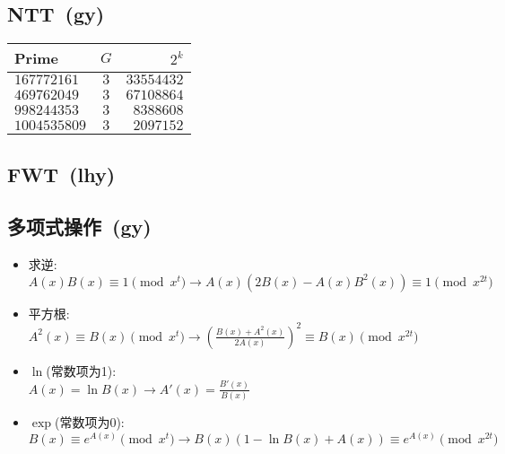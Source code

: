     \subsection*{NTT\ \small(gy)}
        \begin{tabular}{l c r}
            \hline
            Prime & $ G $ & $ 2^k $\\\hline
            $ 167772161 $ & $ 3 $ & $ 33554432 $\\\hline
            $ 469762049 $ & $ 3 $ & $ 67108864 $\\\hline
            $ 998244353 $ & $ 3 $ & $ 8388608 $\\\hline
            $ 1004535809 $ & $ 3 $ & $ 2097152 $\\\hline
        \end{tabular}
    \subsection*{FWT\ \small(lhy)}
    \subsection*{多项式操作\ \small(gy)}
        \begin{itemize}[wide=0pt]
            \item 求逆:
            \\$ A(x) B(x) \equiv 1 \pmod{x^t} \to A(x) (2B(x) - A(x) B^2(x)) \equiv 1 \pmod{x^{2t}} $
            \item 平方根:
            \\$ A^2(x) \equiv B(x) \pmod{x^t} \to (\frac{B(x) + A^2(x)}{2A(x)})^2 \equiv B(x) \pmod{x^{2t}} $
            \item $ \ln $(常数项为1):
            \\$ A(x) = \ln B(x) \to A'(x) = \frac{B'(x)}{B(x)} $
            \item $ \exp $(常数项为0):
            \\$ B(x) \equiv e^{A(x)} \pmod{x^t} \to B(x) (1 - \ln B(x) + A(x)) \equiv e^{A(x)} \pmod{x^{2t}} $
        \end{itemize}

